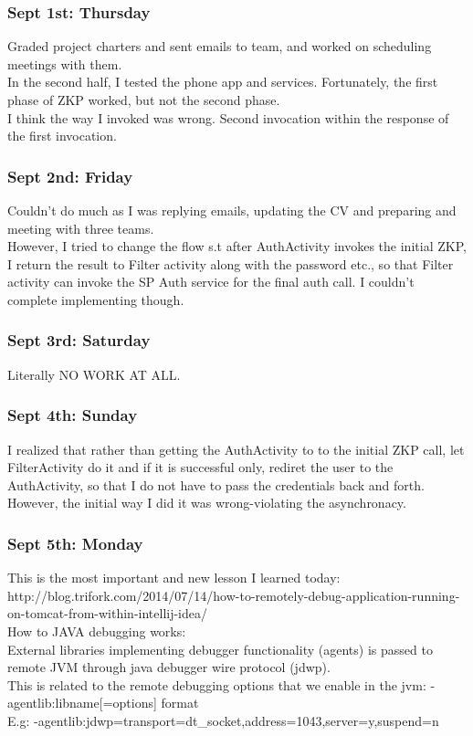\documentclass[11pt]{article}
\begin{document}
\subsubsection*{Sept 1st: Thursday}
Graded project charters and sent emails to team, and worked on scheduling meetings with them.\\
In the second half, I tested the phone app and services. Fortunately, the first phase of ZKP worked, but not the second phase.\\
I think the way I invoked was wrong. Second invocation within the response of the first invocation.

\subsubsection*{Sept 2nd: Friday}
Couldn't do much as I was replying emails, updating the CV and preparing and meeting with three teams.\\
However, I tried to change the flow s.t after AuthActivity invokes the initial ZKP, I return the result to Filter activity along with the password 
etc., so that Filter activity can invoke the SP Auth service for the final auth call. I couldn't complete implementing though.

\subsubsection*{Sept 3rd: Saturday}
Literally NO WORK AT ALL.

\subsubsection*{Sept 4th: Sunday}
I realized that rather than getting the AuthActivity to to the initial ZKP call, let FilterActivity do it and if it is successful only, rediret the 
user to the AuthActivity, so that I do not have to pass the credentials back and forth.\\
However, the initial way I did it was wrong-violating the asynchronacy.\\

\subsubsection*{Sept 5th: Monday}
This is the most important and new lesson I learned today: 
http://blog.trifork.com/2014/07/14/how-to-remotely-debug-application-running-on-tomcat-from-within-intellij-idea/\\
How to JAVA debugging works:\\
External libraries implementing debugger functionality (agents) is passed to remote JVM through java debugger wire protocol (jdwp).\\
This is related to the remote debugging options that we enable in the jvm: -agentlib:libname[=options] format\\
E.g: -agentlib:jdwp=transport=dt_socket,address=1043,server=y,suspend=n\\
\end{document}
